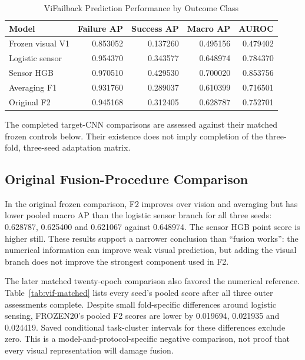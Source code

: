 \begin{table}[htbp]
\caption{ViFailback Prediction Performance by Outcome Class}\label{tab:vif-bothclass}
\centering\small

\begin{tabular}{lrrrr}\hline Model&Failure AP&Success AP&Macro AP&AUROC\\\hline
Frozen visual V1&0.853052&0.137260&0.495156&0.479402\\
Logistic sensor&0.954370&0.343577&0.648974&0.784370\\
Sensor HGB&0.970510&0.429530&0.700020&0.853756\\
Averaging F1&0.931760&0.289037&0.610399&0.716501\\
Original F2&0.945168&0.312405&0.628787&0.752701\\\hline
\end{tabular}
\end{table}

The completed target-CNN comparisons are assessed against their matched frozen controls
below. Their existence does not imply completion of the three-fold, three-seed
adaptation matrix.

\subsection{Original Fusion-Procedure Comparison}
In the original frozen comparison, F2 improves over vision and averaging but has lower
pooled macro AP than the logistic sensor branch for all three seeds: 0.628787, 0.625400
and 0.621067 against 0.648974. The sensor HGB point score is higher still. These results
support a narrower conclusion than ``fusion works'': the numerical information can
improve weak visual prediction, but adding the visual branch does not improve the
strongest component used in F2.

The later matched twenty-epoch comparison also favored the numerical reference.
Table~\ref{tab:vif-matched} lists every seed's pooled score after all three outer
assessments complete. Despite small fold-specific differences around logistic sensing,
FROZEN20's pooled F2 scores are lower by 0.019694, 0.021935 and 0.024419. Saved
conditional task-cluster intervals for these differences exclude zero. This is a
model-and-protocol-specific negative comparison, not proof that every visual
representation will damage fusion.

